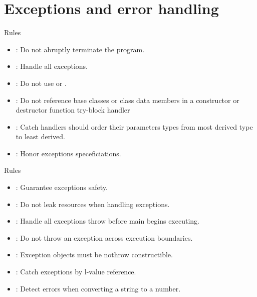 \section{Exceptions and error handling}

\begin{frame}[t]{Rules}
\begin{itemize}
  \item {}: 
        Do not abruptly terminate the program.
  \vfill
  \item {}: 
        Handle all exceptions.
  \vfill
  \item {}: 
        Do not use  or .
  \vfill
  \item {}: 
        Do not reference base classes or class data members in a constructor
        or destructor function try-block handler
  \vfill
  \item {}: 
        Catch handlers should order their parameters types from most derived type to least
        derived.
  \vfill
  \item {}: 
        Honor exceptions speceficiations.
\end{itemize}
\end{frame}


\begin{frame}[t]{Rules}
\begin{itemize}
  \vfill
  \item {}: 
        Guarantee exceptions safety.
  \vfill
  \item {}: 
        Do not leak resources when handling exceptions.
  \vfill
  \item {}: 
        Handle all exceptions throw before main begins executing.
  \vfill
  \item {}: 
        Do not throw an exception across execution boundaries.
  \vfill
  \item {}: 
        Exception objects must be nothrow constructible.
  \vfill
  \item {}: 
        Catch exceptions by l-value reference.
  \vfill
  \item {}: 
        Detect errors when converting a string to a number.
\end{itemize}
\end{frame}



